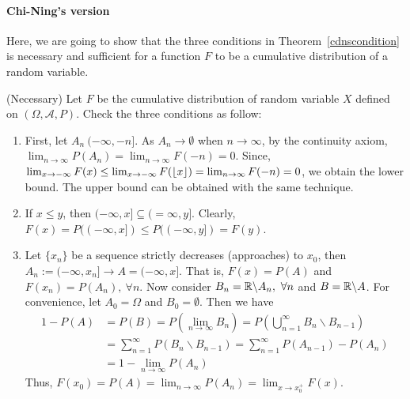 \documentclass[../Probability_Theory.tex]{subfiles}
\begin{document}
\paragraph{\color{red} Chi-Ning's version}
Here, we are going to show that the three conditions in Theorem~\ref{cdnscondition} is necessary and sufficient for a function $F$ to be a cumulative distribution of a random variable.

(Necessary)
Let $F$ be the cumulative distribution of random variable $X$ defined on $(\Omega,\mathcal{A},P)$. Check the three conditions as follow:
\begin{enumerate}
	\item First, let $A_n \ (-\infty,-n]$. As $A_n\rightarrow\emptyset$ when $n\rightarrow\infty$, by the continuity axiom, $\lim_{n\rightarrow\infty}P(A_n) = \lim_{n\rightarrow\infty}F(-n)=0$. Since, $\lim_{x\rightarrow-\infty}F(x)\leq\lim_{x\rightarrow-\infty}F(\floor*{x})=\lim_{n\rightarrow\infty}F(-n)=0$, we obtain the lower bound. The upper bound can be obtained with the same technique.
	\item If $x\leq y$, then $(-\infty,x]\subseteq(=\infty,y]$. Clearly, $F(x) = P((-\infty,x])\leq P((-\infty,y])=F(y)$.
	\item Let $\{x_n\}$ be a sequence strictly decreases (approaches) to $x_0$, then $A_n:=(-\infty,x_n]\rightarrow A = (-\infty,x]$. That is, $F(x) = P(A)$ and $F(x_n) = P(A_n),\ \forall n$. Now consider $B_n=\R\backslash A_n,\ \forall n$ and $B=\R\backslash A$. For convenience, let $A_0 = \Omega$ and $B_0 = \emptyset$. Then we have
	\begin{align*}
	1-P(A) &= P(B) = P(\lim_{n\rightarrow\infty}B_n) = P(\bigcup_{n=1}^{\infty}B_n\backslash B_{n-1})\\
	&=\sum_{n=1}^{\infty} P(B_n\backslash B_{n-1}) = \sum_{n=1}^{\infty} P(A_{n-1}) - P(A_n)\\
	& = 1-\lim_{n\rightarrow\infty}P(A_n)
	\end{align*}
	Thus, $F(x_0) = P(A) = \lim_{n\rightarrow\infty}P(A_n) = \lim_{x\rightarrow x_0^+}F(x)$.
\end{enumerate}
\end{document}
